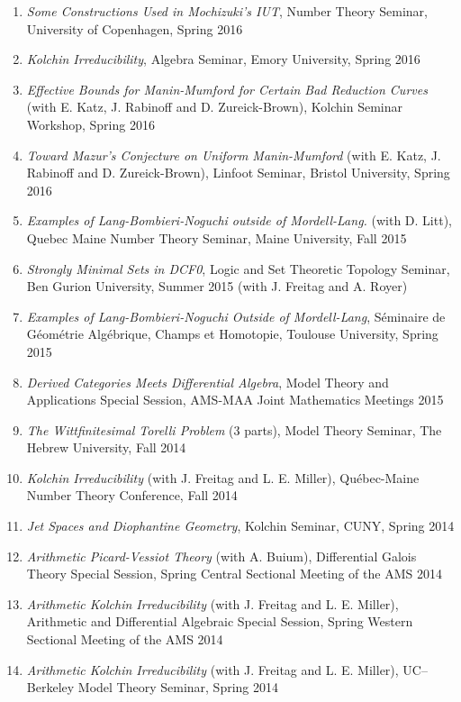 \documentclass[a4paper,10pt]{article}
\begin{document}
\begin{enumerate}
	\item \emph{Some Constructions Used in Mochizuki's IUT},  Number Theory Seminar, University of Copenhagen,  Spring 2016
	\item \emph{Kolchin Irreducibility}, Algebra Seminar, Emory University, Spring 2016 
	\item \emph{Effective Bounds for Manin-Mumford for Certain Bad Reduction Curves} (with E. Katz, J. Rabinoff and D. Zureick-Brown), Kolchin Seminar Workshop, Spring 2016
	\item \emph{Toward Mazur's Conjecture on Uniform Manin-Mumford} (with E. Katz, J. Rabinoff and D. Zureick-Brown), Linfoot Seminar, Bristol University, Spring 2016
	\item \emph{Examples of Lang-Bombieri-Noguchi outside of Mordell-Lang.} (with D. Litt),  Quebec Maine Number Theory Seminar, Maine University, Fall 2015
	\item \emph{Strongly Minimal Sets in DCF0},  Logic and Set Theoretic Topology Seminar, Ben Gurion University, Summer 2015 (with J. Freitag and A. Royer)
	\item \emph{Examples of Lang-Bombieri-Noguchi Outside of Mordell-Lang}, S\'eminaire de G\'eom\'etrie Alg\'ebrique, Champs et Homotopie, Toulouse University, Spring 2015
	\item \emph{Derived Categories Meets Differential Algebra}, Model Theory and Applications Special Session, AMS-MAA Joint Mathematics Meetings 2015
	\item \emph{The Wittfinitesimal Torelli Problem} (3 parts), Model Theory Seminar, The Hebrew University, Fall 2014
	\item \emph{Kolchin Irreducibility} (with J. Freitag and L. E. Miller),
	Qu\'{e}bec-Maine Number Theory Conference, Fall 2014
	\item \emph{Jet Spaces and Diophantine Geometry},
	Kolchin Seminar, CUNY, Spring 2014
	\item \emph{Arithmetic Picard-Vessiot Theory} (with A. Buium),
	Differential Galois Theory Special Session, Spring Central Sectional Meeting of the AMS 2014
	\item \emph{Arithmetic Kolchin Irreducibility} (with J. Freitag and L. E. Miller), 
	Arithmetic and Differential Algebraic Special Session, Spring Western Sectional Meeting of the AMS 2014
	\item \emph{Arithmetic Kolchin Irreducibility} (with J. Freitag and L. E. Miller), UC--Berkeley Model Theory Seminar, Spring 2014

\end{enumerate}
\end{document}
